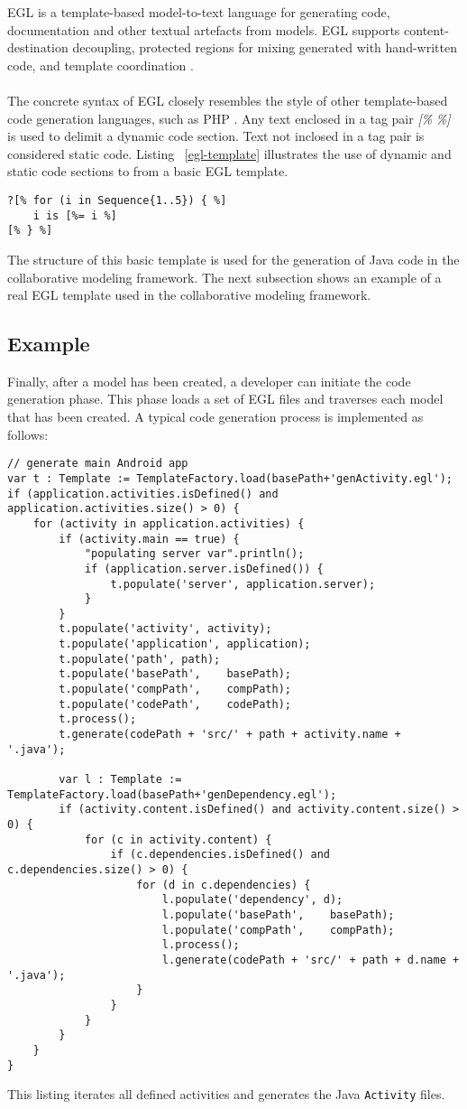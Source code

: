 EGL is a template-based model-to-text language for generating code, documentation and other textual artefacts from models. EGL supports content-destination decoupling, protected regions for mixing generated with hand-written code, and template coordination \cite{EpsilonGenerationLanguage}. \\ \\
The concrete syntax of EGL closely resembles the style of other template-based code generation languages, such as PHP \cite{EpsilonBook}. Any text enclosed in a tag pair \textit{[\%} \textit{\%]} is used to delimit a dynamic code section. Text not inclosed in a tag pair is considered static code. Listing ~\ref{egl-template} illustrates the use of dynamic and static code sections to from a basic EGL template. 
\begin{lstlisting}[label=egl-template,caption=EGL template, captionpos=t]
?[% for (i in Sequence{1..5}) { %]
	i is [%= i %]
[% } %]
\end{lstlisting}
The structure of this basic template is used for the generation of Java code in the collaborative modeling framework. The next subsection shows an example of a real EGL template used in the collaborative modeling framework.

\subsection{Example}

Finally, after a model has been created, a developer can initiate the code generation phase. This phase loads a set of EGL files and traverses each model that has been created. A typical code generation process is implemented as follows:

\begin{lstlisting}[label=codegen-app,caption=Android code-generation, captionpos=t]
// generate main Android app
var t : Template := TemplateFactory.load(basePath+'genActivity.egl');
if (application.activities.isDefined() and application.activities.size() > 0) {
	for (activity in application.activities) {
		if (activity.main == true) {
			"populating server var".println();
			if (application.server.isDefined()) {
				t.populate('server', application.server);
			}
		}
		t.populate('activity', activity);
		t.populate('application', application);
		t.populate('path', path);
		t.populate('basePath',    basePath);
		t.populate('compPath',    compPath);
		t.populate('codePath',	  codePath);
		t.process();
		t.generate(codePath + 'src/' + path + activity.name + '.java');
	
		var l : Template := TemplateFactory.load(basePath+'genDependency.egl');
		if (activity.content.isDefined() and activity.content.size() > 0) {
			for (c in activity.content) {
				if (c.dependencies.isDefined() and c.dependencies.size() > 0) {
					for (d in c.dependencies) {
						l.populate('dependency', d);
						l.populate('basePath',    basePath);
						l.populate('compPath',    compPath);
						l.process();
						l.generate(codePath + 'src/' + path + d.name + '.java');
					}
				}
			}
		}
	}
}
\end{lstlisting}
This listing iterates all defined activities and generates the Java \texttt{Activity} files.
